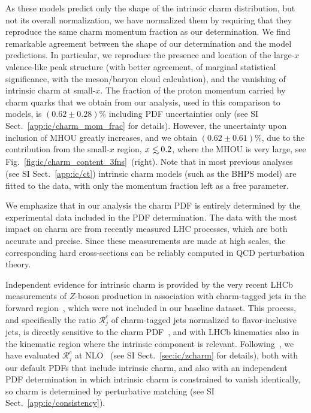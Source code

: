 As these models predict only the shape of the
intrinsic charm distribution, but not 
its overall normalization, we have normalized them by requiring
that they reproduce the same 
charm momentum fraction as our determination.
%
We find remarkable agreement between the shape of our 
determination and the model predictions.
%
In particular, we reproduce  the presence and location of the large-$x$ valence-like peak
structure (with  better agreement, of marginal statistical significance, with
the meson/baryon cloud calculation),  and the vanishing of 
intrinsic charm at small-$x$.
%
The fraction of the proton momentum carried by charm quarks that we
obtain from our analysis, 
used in this comparison to models,  is $\left( 0.62 \pm 0.28\right) \%$
including PDF uncertainties only (see
SI Sect.~\ref{app:ic/charm_mom_frac} for details).
%
However, the uncertainty
upon inclusion of MHOU greatly increases, and we obtain
$\left( 0.62 \pm 0.61\right) \%$, due to the contribution from the small-$x$
region, $x\lsim 0.2$, where the MHOU is very large, see
Fig.~\ref{fig:ic/charm_content_3fns}~(right).
%
%
Note that in most previous
analyses~\cite{Hou:2017khm} (see SI Sect.~\ref{app:ic/ct}) intrinsic charm models (such as the BHPS
model) are fitted to the data, with only the momentum fraction left as
a free parameter.

We emphasize that in our analysis the charm PDF is entirely
determined by the experimental data included in the PDF determination.
The data with the most impact on charm are from recently measured LHC
processes, which are both accurate and precise.
%
Since these measurements are made at high scales, the corresponding
hard cross-sections can be reliably computed in QCD perturbation theory.

Independent evidence for intrinsic charm
is provided by the very recent LHCb measurements of $Z$-boson production
in association with charm-tagged jets in the forward
region~\cite{LHCb:2021stx}, which were not included in our baseline dataset.
%
This process, and specifically the ratio $\mathcal{R}_j^c$
of charm-tagged jets normalized to flavor-inclusive jets,
is directly sensitive to the charm PDF~\cite{Boettcher:2015sqn}, and
with LHCb kinematics also
in the kinematic region  where the  intrinsic component is relevant.
%
Following~\cite{Boettcher:2015sqn,LHCb:2021stx}, we have 
evaluated $\mathcal{R}_j^c$ at NLO~\cite{Alioli:2010xd,Sjostrand:2007gs}  
(see  SI Sect.~\ref{sec:ic/zcharm} for details), both with our default PDFs
that include intrinsic charm, and also with an independent PDF determination in
which intrinsic charm is constrained to vanish 
identically, so charm is determined by perturbative matching
(see SI Sect.~\ref{app:ic/consistency}).

